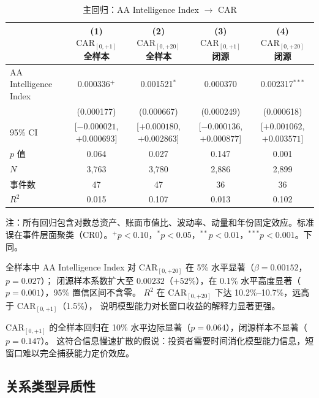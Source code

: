 \documentclass[11pt,fontset=fandol,a4paper]{ctexart}
\begin{document}
\begin{table}[htbp]
\centering
\caption{主回归：AA Intelligence Index $\rightarrow$ CAR}
\label{tab:main_reg}
\small
\begin{threeparttable}
\begin{tabular}{lcccc}
\toprule
 & (1) $\text{CAR}_{[0,+1]}$ 全样本 & (2) $\text{CAR}_{[0,+20]}$ 全样本
 & (3) $\text{CAR}_{[0,+1]}$ 闭源 & (4) $\text{CAR}_{[0,+20]}$ 闭源 \\
\midrule
AA Intelligence Index & 0.000336$^{+}$ & 0.001521$^{*}$ & 0.000370 & 0.002317$^{***}$ \\
                      & (0.000177)      & (0.000667)     & (0.000249) & (0.000618) \\
95\% CI               & [$-0.000021$, $+0.000693$] & [$+0.000180$, $+0.002863$] & [$-0.000136$, $+0.000877$] & [$+0.001062$, $+0.003571$] \\
$p$ 值                & 0.064           & 0.027          & 0.147       & 0.001 \\
\midrule
$N$                   & 3{,}763         & 3{,}780        & 2{,}886     & 2{,}899 \\
事件数                & 47              & 47             & 36          & 36 \\
$R^2$                 & 0.015           & 0.107          & 0.013       & 0.102 \\
\bottomrule
\end{tabular}
\begin{tablenotes}\footnotesize
\item 注：所有回归包含对数总资产、账面市值比、波动率、动量和年份固定效应。标准误在事件层面聚类（CR0）。$^{+}p<0.10$，$^{*}p<0.05$，$^{**}p<0.01$，$^{***}p<0.001$。下同。
\end{tablenotes}
\end{threeparttable}
\end{table}

全样本中 AA Intelligence Index 对 $\text{CAR}_{[0,+20]}$ 在 5\% 水平显著（$\beta=0.00152$，$p=0.027$）；
闭源样本系数扩大至 $0.00232$（$+52\%$），在 0.1\% 水平高度显著（$p=0.001$），95\% 置信区间不含零。
$R^2$ 在 $\text{CAR}_{[0,+20]}$ 下达 10.2\%--10.7\%，远高于 $\text{CAR}_{[0,+1]}$（1.5\%），
说明模型能力对长窗口收益的解释力显著更强。

$\text{CAR}_{[0,+1]}$ 的全样本回归在 10\% 水平边际显著（$p=0.064$），闭源样本不显著（$p=0.147$）。
这符合信息慢速扩散的假说：投资者需要时间消化模型能力信息，短窗口难以完全捕获能力定价效应。

\subsection{关系类型异质性}
\end{document}
